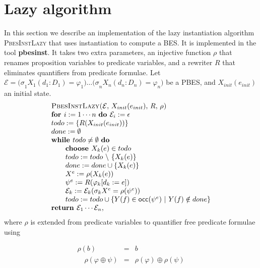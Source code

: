\documentclass{article}
\begin{document}
\section{Lazy algorithm}

In this section we describe an implementation of the lazy instantiation
algorithm \textsc{PbesInstLazy} that uses instantiation to compute a BES. It
is implemented in the tool \textbf{pbesinst}. It takes two extra parameters,
an injective function $\rho $ that renames proposition variables to
predicate variables, and a rewriter $R$ that eliminates quantifiers from
predicate formulae. Let $\mathcal{E=(\sigma }_{1}X_{1}(d_{1}:D_{1})=\varphi
_{1})\ldots \mathcal{(\sigma }_{n}X_{n}(d_{n}:D_{n})=\varphi _{n})$ be a
PBES, and $X_{init}(e_{init})$ an initial state.%
\begin{equation*}
\begin{array}{l}
\text{\textsc{PbesInstLazy(}}\mathcal{E}\text{, }X_{init}(e_{init})\text{, }R%
\text{, }\rho \text{\textsc{)}} \\
\text{\textbf{for }}i:=1\cdots n\text{ \textbf{do }}\mathcal{E}%
_{i}:=\epsilon  \\
todo:=\{R(X_{init}(e_{init}))\} \\
done:=\emptyset  \\
\text{\textbf{while }}todo\neq \emptyset \text{ \textbf{do}} \\
\qquad \text{\textbf{choose }}X_{k}(e)\in todo \\
\qquad todo:=todo\ \backslash \ \{X_{k}(e)\} \\
\qquad done:=done\cup \{X_{k}(e)\} \\
\qquad X^{e}:=\rho (X_{k}(e)) \\
\qquad \psi ^{e}:=R(\varphi _{k}[d_{k}:=e]) \\
\qquad \mathcal{E}_{k}:=\mathcal{E}_{k}(\mathcal{\sigma }_{k}X^{e}=\rho
(\psi ^{e})) \\
\qquad todo:=todo\cup \{Y(f)\in \mathsf{occ}(\psi ^{e})\ |\ Y(f)\notin done\}
\\
\text{\textbf{return }}\mathcal{E}_{1}\cdots \mathcal{E}_{n},%
\end{array}%
\end{equation*}%
where $\rho $ is extended from predicate variables to quantifier free
predicate formulae using

\begin{eqnarray*}
\rho (b) &=&b \\
\quad \rho (\varphi \oplus \psi ) &=&\rho (\varphi )\oplus \rho (\psi )
\end{eqnarray*}%
\newpage
\end{document}
